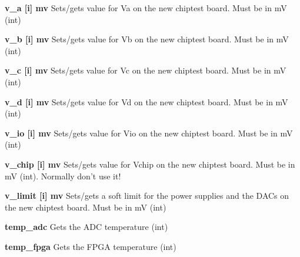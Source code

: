 \begin{DoxyItemize}
\item {\bfseries v\_\-a \mbox{[}i\mbox{]} mv} Sets/gets value for Va on the new chiptest board. Must be in mV (int)
\end{DoxyItemize}


\begin{DoxyItemize}
\item {\bfseries v\_\-b \mbox{[}i\mbox{]} mv} Sets/gets value for Vb on the new chiptest board. Must be in mV (int)
\end{DoxyItemize}


\begin{DoxyItemize}
\item {\bfseries v\_\-c \mbox{[}i\mbox{]} mv} Sets/gets value for Vc on the new chiptest board. Must be in mV (int)
\end{DoxyItemize}


\begin{DoxyItemize}
\item {\bfseries v\_\-d \mbox{[}i\mbox{]} mv} Sets/gets value for Vd on the new chiptest board. Must be in mV (int)
\end{DoxyItemize}


\begin{DoxyItemize}
\item {\bfseries v\_\-io \mbox{[}i\mbox{]} mv} Sets/gets value for Vio on the new chiptest board. Must be in mV (int)
\end{DoxyItemize}


\begin{DoxyItemize}
\item {\bfseries v\_\-chip \mbox{[}i\mbox{]} mv} Sets/gets value for Vchip on the new chiptest board. Must be in mV (int). Normally don't use it!
\end{DoxyItemize}


\begin{DoxyItemize}
\item {\bfseries v\_\-limit \mbox{[}i\mbox{]} mv} Sets/gets a soft limit for the power supplies and the DACs on the new chiptest board. Must be in mV (int)
\end{DoxyItemize}


\begin{DoxyItemize}
\item {\bfseries temp\_\-adc} Gets the ADC temperature (int)
\end{DoxyItemize}


\begin{DoxyItemize}
\item {\bfseries temp\_\-fpga} Gets the FPGA temperature (int)
\end{DoxyItemize}


